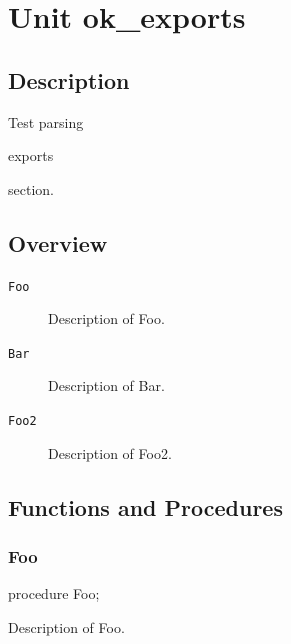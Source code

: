 \documentclass{report}
\begin{document}
\newlength{\tmplength}
\chapter{Unit ok{\_}exports}
\section{Description}
Test parsing \begin{ttfamily}exports\end{ttfamily} section.
\section{Overview}
\begin{description}
\item[\texttt{Foo}]Description of Foo.
\item[\texttt{Bar}]Description of Bar.
\item[\texttt{Foo2}]Description of Foo2.
\end{description}
\section{Functions and Procedures}
\subsection*{Foo}
\begin{list}{}{
\setlength{\itemindent}{0cm}
\setlength{\listparindent}{0cm}
\setlength{\leftmargin}{\evensidemargin}
\addtolength{\leftmargin}{\tmplength}
\settowidth{\labelsep}{X}
\addtolength{\leftmargin}{\labelsep}
\setlength{\labelwidth}{\tmplength}
}
\begin{flushleft}
\item[\textbf{Declaration}\hfill]
\begin{ttfamily}
procedure Foo;\end{ttfamily}


\end{flushleft}
\par
\item[\textbf{Description}]
Description of Foo.

\end{list}
\end{document}
